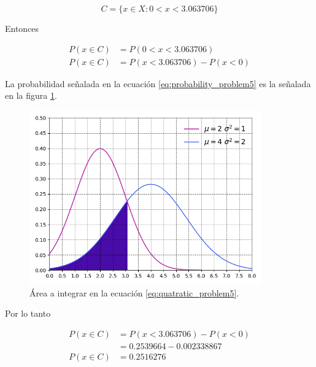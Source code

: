 \begin{equation*}
    C=\{x\in X : 0<x<3.063706\}
\end{equation*}

Entonces

\begin{align}
    P(x\in C) & = P(0<x<3.063706)                                    \nonumber \\
    P(x\in C) & = P(x<3.063706) - P(x<0) \label{eq:probability_problem5}
\end{align}

La probabilidad señalada en la ecuación \ref{eq:probability_problem5} es la señalada en la figura \ref{fig:probability_problem5}.

\begin{figure}[H]
    \centering
    \includegraphics[width=10cm]{Graphics/problem5.png}
    \caption{Área a integrar en la ecuación \ref{eq:quatratic_problem5}.}
    \label{fig:probability_problem5}
\end{figure}

Por lo tanto

\begin{align*}
    P(x\in C) & = P(x<3.063706) - P(x<0)  \\
              & = 0.2539664 - 0.002338867 \\
    P(x\in C) & = 0.2516276
\end{align*}